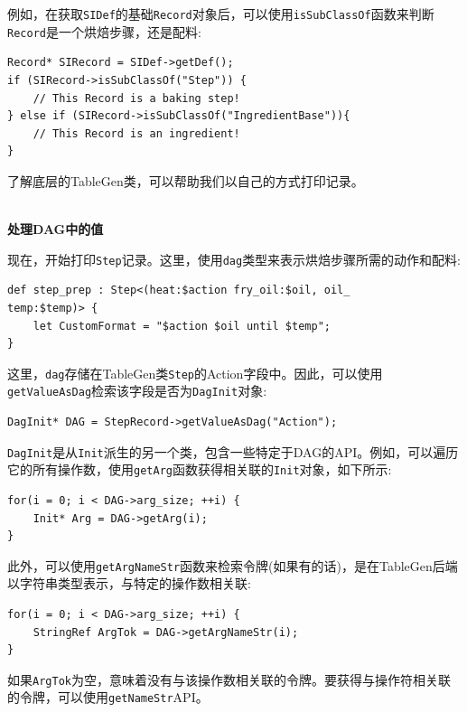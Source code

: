 例如，在获取\texttt{SIDef}的基础\texttt{Record}对象后，可以使用\texttt{isSubClassOf}函数来判断\texttt{Record}是一个烘焙步骤，还是配料:

\begin{lstlisting}[style=styleCXX]
Record* SIRecord = SIDef->getDef();
if (SIRecord->isSubClassOf("Step")) {
	// This Record is a baking step!
} else if (SIRecord->isSubClassOf("IngredientBase")){
	// This Record is an ingredient!
}
\end{lstlisting}

了解底层的TableGen类，可以帮助我们以自己的方式打印记录。

\hspace*{\fill} \\ %
\noindent
\textbf{处理DAG中的值}

现在，开始打印\texttt{Step}记录。这里，使用\texttt{dag}类型来表示烘焙步骤所需的动作和配料:

\begin{lstlisting}[style=styleCXX]
def step_prep : Step<(heat:$action fry_oil:$oil, oil_
temp:$temp)> {
	let CustomFormat = "$action $oil until $temp";
}
\end{lstlisting}

这里，\texttt{dag}存储在TableGen类\texttt{Step}的Action字段中。因此，可以使用\texttt{getValueAsDag}检索该字段是否为\texttt{DagInit}对象:

\begin{lstlisting}[style=styleCXX]
DagInit* DAG = StepRecord->getValueAsDag("Action");
\end{lstlisting}

\texttt{DagInit}是从\texttt{Init}派生的另一个类，包含一些特定于DAG的API。例如，可以遍历它的所有操作数，使用\texttt{getArg}函数获得相关联的\texttt{Init}对象，如下所示:

\begin{lstlisting}[style=styleCXX]
for(i = 0; i < DAG->arg_size; ++i) {
	Init* Arg = DAG->getArg(i);
}
\end{lstlisting}

此外，可以使用\texttt{getArgNameStr}函数来检索令牌(如果有的话)，是在TableGen后端以字符串类型表示，与特定的操作数相关联:

\begin{lstlisting}[style=styleCXX]
for(i = 0; i < DAG->arg_size; ++i) {
	StringRef ArgTok = DAG->getArgNameStr(i);
}
\end{lstlisting}

如果\texttt{ArgTok}为空，意味着没有与该操作数相关联的令牌。要获得与操作符相关联的令牌，可以使用\texttt{getNameStr}API。

